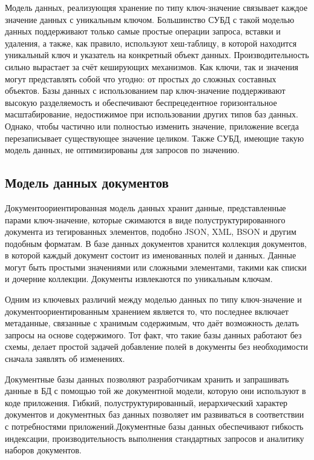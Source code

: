Модель данных, реализующяя хранение по типу ключ‑значение связывает каждое значение данных с уникальным ключом. Большинство СУБД с такой моделью данных поддерживают только самые простые операции запроса, вставки и удаления, а также, как правило, используют хеш-таблицу, в которой находится уникальный ключ и указатель на конкретный объект данных. Производительность сильно вырастает за счёт кеширующих механизмов. 
Как ключи, так и значения могут представлять собой что угодно: от простых до сложных составных объектов. Базы данных с использованием пар ключ‑значение поддерживают высокую разделяемость и обеспечивают беспрецедентное горизонтальное масштабирование, недостижимое при использовании других типов баз данных. Однако, чтобы частично или полностью изменить значение, приложение всегда перезаписывает существующее значение целиком. Также СУБД, имеющие такую модель данных, не оптимизированы для запросов по значению.

\subsection{Модель данных документов}

Документоориентированная модель данных хранит данные, представленные парами ключ-значение, которые сжимаются в виде полуструктурированного документа из тегированных элементов, подобно JSON, XML, BSON и другим подобным форматам. В базе данных документов хранится коллекция документов, в которой каждый документ состоит из именованных полей и данных. Данные могут быть простыми значениями или сложными элементами, такими как списки и дочерние коллекции. Документы извлекаются по уникальным ключам. 

Одним из ключевых различий между моделью данных по типу ключ-значение и документоориентированным хранением является то, что последнее включает метаданные, связанные с хранимым содержимым, что даёт возможность делать запросы на основе содержимого. Тот факт, что такие базы данных работают без схемы, делает простой задачей добавление полей в документы без необходимости сначала заявлять об изменениях. 

Документные базы данных позволяют разработчикам хранить и запрашивать данные в БД с помощью той же документной модели, которую они используют в коде приложения. Гибкий, полуструктурированный, иерархический характер документов и документных баз данных позволяет им развиваться в соответствии с потребностями приложений.Документные базы данных обеспечивают гибкость индексации, производительность выполнения стандартных запросов и аналитику наборов документов.

